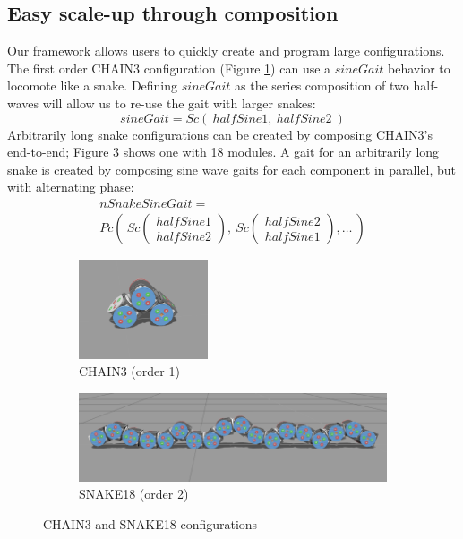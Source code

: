 \documentclass[conference]{IEEEtran}
\theoremstyle{definition}
\begin{document}
\subsection{Easy scale-up through composition}
Our framework allows users to quickly create and program large configurations. The
first order CHAIN3 configuration (Figure \ref{fig:chain3}) can use a \(sineGait\)
behavior to locomote like a snake. Defining \(sineGait\)  as the series composition
of two half-waves will allow us to re-use the gait with larger snakes:
\begin{displaymath}
sineGait = Sc(~halfSine1,~halfSine2~)
\end{displaymath}
Arbitrarily long snake configurations can be created
by composing CHAIN3's end-to-end; Figure \ref{fig:snake18} shows one with 18 modules.
A gait for an arbitrarily long snake is created by composing sine wave
gaits for each component in parallel, but with alternating phase:
\begin{align*}
nSnakeSineGait = ~~~~~~~~~~~~~~~~~~~~~~~~~~~~~~~~~~~~~~~~~~\\
Pc \left(~Sc\begin{pmatrix} halfSine1 \\ halfSine2 \end{pmatrix},
~Sc\begin{pmatrix} halfSine2 \\ halfSine1 \end{pmatrix},\ldots ~\right)
\end{align*}

\begin{figure}
        \begin{subfigure}{\columnwidth}
        \begin{center}
                \includegraphics[width=1.5in]{images/library/snake3.png}
        \end{center}
                \caption{CHAIN3 (order 1)}
                \label{fig:chain3}
        \end{subfigure}
        \begin{subfigure}{\columnwidth}
                \includegraphics[width=\columnwidth]{images/library/snake18.png}
                \caption{SNAKE18 (order 2)}
                \label{fig:snake18}
        \end{subfigure}
\caption{CHAIN3 and SNAKE18 configurations}
\end{figure}
\end{document}
